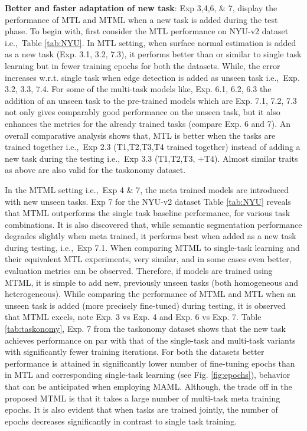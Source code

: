 \documentclass[conference]{IEEEtran}
\newcommand*{\ie}		{i.e.,\ }
\begin{document}
\textbf{Better and faster adaptation of new task}:
Exp 3,4,6, \& 7, display the performance of \ac{MTL} and \ac{MTML} when a new task is added during the test phase.
To begin with, first consider the \ac{MTL} performance on NYU-v2 dataset \ie Table \ref{tab:NYU}.
In \ac{MTL} setting, when surface normal estimation is added as a new task (Exp. 3.1, 3.2, 7.3), it performs better than or similar to single task learning but in fewer training epochs for both the datasets.   
While, the error increases w.r.t. single task when edge detection is added as unseen task \ie Exp. 3.2, 3.3, 7.4.
For some of the multi-task models  like, Exp. 6.1, 6.2, 6.3 the addition of an unseen task to the pre-trained models  which are Exp. 7.1, 7.2, 7.3 not only gives comparably good performance on the unseen task, but it also enhances the metrics for the already trained tasks (compare Exp. 6 and 7). 
An overall comparative analysis shows that, \ac{MTL} is better when the tasks are trained together \ie Exp 2.3 (T1,T2,T3,T4 trained together) instead of adding a new task during the testing \ie Exp 3.3 (T1,T2,T3, +T4).
Almost similar traits as above are also valid for the taskonomy dataset.


In the \ac{MTML} setting \ie Exp 4 \& 7, the meta trained models are introduced with new unseen tasks.
Exp 7 for the NYU-v2 dataset Table \ref{tab:NYU} reveals that \ac{MTML} outperforms the single task baseline performance, for various task combinations.
It is also discovered that, while semantic segmentation performance degrades slightly when meta trained, it performs best when added as a new task during testing, \ie Exp 7.1.
When comparing \ac{MTML} to single-task learning and their equivalent \ac{MTL} experiments, very similar, and in some cases even better, evaluation metrics can be observed.
Therefore, if models are trained using \ac{MTML}, it is simple to add new, previously unseen tasks (both homogeneous and heterogeneous).
While comparing the performance of \ac{MTML} and \ac{MTL} when an unseen task is added (more precisely fine-tuned) during testing, it is observed that \ac{MTML} excels, note Exp. 3 vs Exp. 4 and Exp. 6 vs Exp. 7. 
Table \ref{tab:taskonomy}, Exp. 7 from the taskonomy dataset shows that the new task achieves performance on par with that of the single-task and multi-task variants with significantly fewer training iterations.
For both the datasets better performance is attained in significantly lower number of fine-tuning epochs than in \ac{MTL} and corresponding single-task learning (see Fig. \ref{fig:epochs}), behavior that can be anticipated when employing MAML\cite{pmlr-v70-finn17a}.
Although, the trade off in the proposed \ac{MTML} is that it takes a large number of multi-task meta training epochs.
It is also evident that when tasks are trained jointly, the number of epochs decreases significantly in contrast to single task training. 
\end{document}
